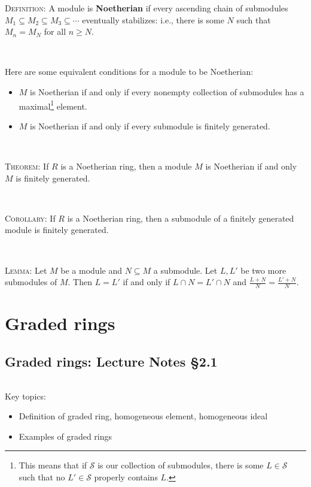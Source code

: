 \documentclass[12pt]{amsart}
\newcommand{\0}{$\phantom{.}$}
\newcommand{\1}{\mathbbm{1}}
\newcommand{\ds}{\displaystyle}
\begin{document}
\noindent \textsc{Definition:} A module is \textbf{Noetherian} if every ascending chain of submodules $M_1 \subseteq M_2 \subseteq M_3 \subseteq \cdots$ eventually stabilizes: i.e., there is some $N$ such that $M_n=M_N$ for all $n\geq N$.

\

\noindent Here are some equivalent conditions for a module to be Noetherian:

\begin{itemize}
\item $M$ is Noetherian if and only if every nonempty collection of submodules has a maximal\footnote{This means that if $\mathcal{S}$ is our collection of submodules, there is some $L\in \mathcal{S}$ such that no $L'\in \mathcal{S}$ properly contains $L$.} element.
\item $M$ is Noetherian if and only if every submodule is finitely generated.
\end{itemize}

\

\noindent \textsc{Theorem:} If $R$ is a Noetherian ring, then a module $M$ is Noetherian if and only $M$ is finitely generated.

\

\noindent \textsc{Corollary:} If $R$ is a Noetherian ring, then a submodule of a finitely generated module is finitely generated.


\

\noindent \textsc{Lemma:} Let $M$ be a module and $N\subseteq M$ a submodule. Let $L,L'$ be two more submodules of $M$. Then $L=L'$ if and only if $\displaystyle L\cap N= L'\cap N$ and $\ds\frac{L+N}{N} = \frac{L'+N}{N}$.




\newpage
\section{Graded rings} 
\setcounter{subsection}{10}
\subsection{Graded rings: Lecture Notes \S2.1} \0

\begin{framed} Key topics:
\begin{itemize}
\item Definition of graded ring, homogeneous element, homogeneous ideal
\item Examples of graded rings
\end{itemize}
\end{framed}
\end{document}
